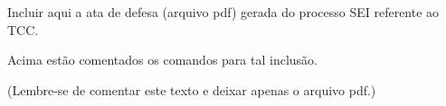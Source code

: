 \documentclass[
	12pt,				%
	openright,			%
	oneside,			%
	a4paper,			%
	sumario = tradicional,
	english,			%
	brazil,				%
	]{abntex2}
\begin{document}
%
{
\centerline{Incluir aqui a ata de defesa (arquivo pdf) gerada do processo SEI referente ao TCC.\\}
%
\centerline{Acima estão comentados os comandos para tal inclusão.\\ }

\centerline{(Lembre-se de comentar este texto e deixar apenas o arquivo pdf.)}
\newpage
}






%


\tableofcontents*
\cleardoublepage




\textual
\setcounter{chapter}{1}






\end{document}
